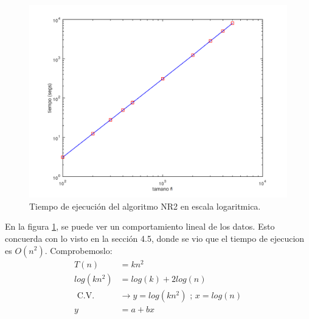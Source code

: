 \documentclass{endm}
\begin{document}
\begin{figure}[h!]
    \includegraphics[width=\linewidth]{Grafica_5_3_2.png}
    \caption{Tiempo de ejecución del algoritmo NR2 en escala logaritmica.}
    \label{fig:Grafica_5_3_2}
\end{figure}
En la figura \ref{fig:Grafica_5_3_2}, se puede ver un comportamiento lineal de los datos.
Esto concuerda con lo visto en la sección 4.5, donde se vio que el tiempo de ejecucion es $O(n^2)$.
Comprobemoslo:
\begin{align}
    T(n) &= kn^2 \\
    log(kn^2) &= log(k) + 2log(n) \\
    \text{ C.V.}& \rightarrow y = log(kn^2) \text{ ; } x = log(n) \\
    y &= a + bx
\end{align}

\end{document}
